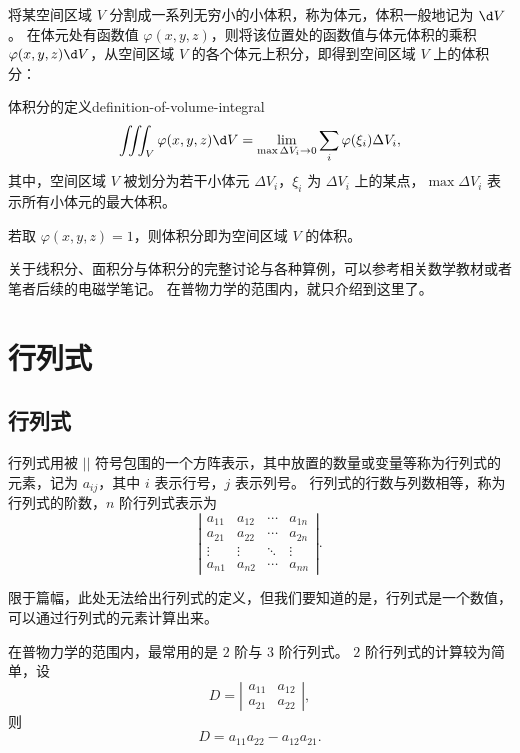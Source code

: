 \bigskip

将某空间区域 $ V $ 分割成一系列无穷小的小体积，称为体元，体积一般地记为 $ \d V $。
在体元处有函数值 $ \varphi (x, y, z) $，则将该位置处的函数值与体元体积的乘积 $ \varphi (x, y, z) \d V $，从空间区域 $ V $ 的各个体元上积分，即得到空间区域 $ V $ 上的体积分：
\begin{definition}{体积分的定义}{definition-of-volume-integral}
    \begin{equation}
        \iiint_V \varphi (x, y, z) \d V = \lim_{\max \Delta V_i \to 0} \sum_{i} \varphi (\xi_i) \Delta V_i ,
    \end{equation}
    其中，空间区域 $ V $ 被划分为若干小体元 $ \Delta V_i $，$ \xi_i $ 为 $ \Delta V_i $ 上的某点，$ \max \Delta V_i $ 表示所有小体元的最大体积。
\end{definition}

若取 $ \varphi (x, y, z) = 1 $，则体积分即为空间区域 $ V $ 的体积。

关于线积分、面积分与体积分的完整讨论与各种算例，可以参考相关数学教材或者笔者后续的电磁学笔记。
在普物力学的范围内，就只介绍到这里了。

\section{行列式}\label{sec:determinant}

\subsection{行列式}\label{subsec:determinant}
行列式用被 $ || $ 符号包围的一个方阵表示，其中放置的数量或变量等称为行列式的元素，记为 $ a_{ij} $，其中 $ i $ 表示行号，$ j $ 表示列号。
行列式的行数与列数相等，称为行列式的阶数，$ n $ 阶行列式表示为
\begin{equation}
    \left| \begin{array}{cccc}
        a_{11} & a_{12} & \cdots & a_{1n} \\
        a_{21} & a_{22} & \cdots & a_{2n} \\
        \vdots & \vdots & \ddots & \vdots \\
        a_{n1} & a_{n2} & \cdots & a_{nn}
    \end{array} \right| .
\end{equation}

限于篇幅，此处无法给出行列式的定义，但我们要知道的是，行列式是一个数值，可以通过行列式的元素计算出来。

在普物力学的范围内，最常用的是 $ 2 $ 阶与 $ 3 $ 阶行列式。
$ 2 $ 阶行列式的计算较为简单，设
\begin{equation}
    D = \left| \begin{array}{cc}
        a_{11} & a_{12} \\
        a_{21} & a_{22}
    \end{array} \right| ,
\end{equation}
则
\begin{equation}
    D = a_{11} a_{22} - a_{12} a_{21} .
\end{equation}

